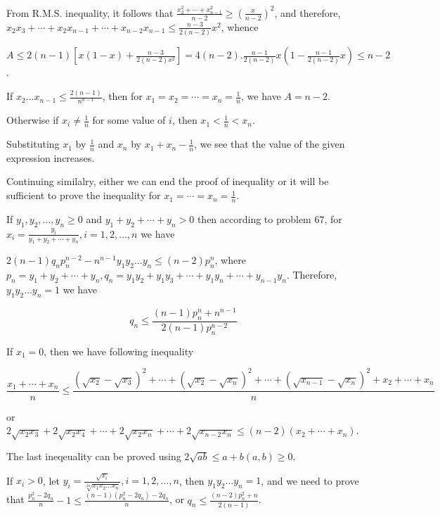   From R.M.S. inequality, it follows that $\frac{x_2^2 + \cdots + x_{n - 1}^2}{n - 2}\geq \left(\frac{x}{n -
  2}\right)^2$, and therefore, $x_2x_3 + \cdots + x_2x_{n - 1} + \cdots + x_{n - 2}x_{n - 1}\leq \frac{n -
    3}{2(n - 2)}x^2$, whence

  $A\leq 2(n - 1)\left[x(1 - x) + \frac{n - 3}{2(n - 2)x^2}\right] = 4(n - 2).\frac{n - 1}{2(n - 2)}x\left(1
  - \frac{n - 1}{2(n - 2)}x\right)\leq n - 2$.

  If $x_2\ldots x_{n - 1}\leq \frac{2(n - 1)}{n^{n - 1}}$, then for $x_1 = x_2 = \cdots = x_n =
  \frac{1}{n}$, we have $A = n - 2$.

  Otherwise if $x_i \neq \frac{1}{n}$ for some value of $i$, then $x_1 < \frac{1}{n} < x_n$.

  Substituting $x_1$ by $\frac{1}{n}$ and $x_n$ by $x_1 + x_n - \frac{1}{n}$, we see that the value of the
  given expression increases.

  Continuing similalry, either we can end the proof of inequality or it will be sufficient to prove the
  inequality for $x_1 = \cdots = x_n = \frac{1}{n}$.
\item If $y_1, y_2, \ldots, y_n\geq 0$ and $y_1 + y_2 + \cdots + y_n > 0$ then according to problem $67$,
  for $x_i = \frac{y_i}{y_1 + y_2 + \cdots + y_n}, i = 1, 2, \ldots, n$ we have

  $2(n - 1)q_np_n^{n - 2} - n^{n - 1}y_1y_2\ldots y_n\leq (n - 2)p_n^n$, where $p_n = y_1 + y_2 + \cdots +
  y_n, q_n = y_1y_2 + y_1y_3 + \cdots + y_1y_n + \cdots + y_{n - 1}y_n$. Therefore, $y_1y_2\ldots y_n = 1$
  we have

  $$q_n\leq \frac{(n - 1)p_n^n + n^{n - 1}}{2(n - 1)p_n^{n - 2}}$$

  If $x_1 = 0$, then we have following inequality

  $$\frac{x_1 + \cdots + x_n}{n}\leq \frac{(\sqrt{x_2} - \sqrt{x_3})^2 + \cdots + (\sqrt{x_2} -
    \sqrt{x_n})^2 + \cdots + (\sqrt{x_{n - 1}} - \sqrt{x_n})^2 + x_2 + \cdots + x_n}{n}$$

  or $2\sqrt{x_2x_3} + 2\sqrt{x_2x_4} + \cdots + 2\sqrt{x_2x_n} + \cdots + 2\sqrt{x_{n - 2}x_n}\leq (n -
  2)(x_2 + \cdots + x_n)$.

  The last ineqeuality can be proved using $2\sqrt{ab}\leq a + b(a, b)\geq 0$.

  If $x_i > 0$, let $y_i = \frac{\sqrt{x_i}}{\sqrt[2n]{x_1x_2\ldots x_n}}, i = 1, 2, \ldots, n$, then
  $y_1y_2\ldots y_n = 1$, and we need to prove that $\frac{p_n^2 - 2q_n}{n} - 1\leq \frac{(n - 1)(p_n^2 -
    2q_n) - 2q_n}{n}$, or $q_n\leq \frac{(n - 2)p_n^2 + n}{2(n - 1)}$.

